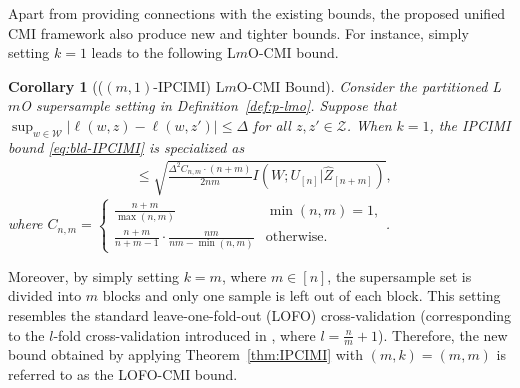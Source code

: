 \documentclass[onecolumn,romanappendices,10pt]{IEEEtran}
\newtheorem{corollary}{Corollary}
\newcommand{\Wcal}{{\mathcal W}}
\newcommand{\Zcal}{{\mathcal Z}}
\DeclareMathOperator{\gen}{\overline{gen}}
\begin{document}
	Apart from providing connections with the existing bounds, the proposed unified CMI framework also produce new and tighter bounds. For instance, simply setting $k=1$ leads to the following L$m$O-CMI bound.
	\begin{corollary}[($(m, 1)$-IPCIMI) L$m$O-CMI Bound] \label{cor:lmo-CMI}
		Consider the partitioned L$m$O supersample setting in Definition~\ref{def:p-lmo}. Suppose that $\sup_{w \in \Wcal} |\ell(w, z) - \ell(w, z')| \leq \Delta$ for all $z, z' \in \Zcal$. When $k=1$, the IPCIMI bound \eqref{eq:bld-IPCIMI} is specialized as
		\begin{align}
			\gen \leq \sqrt{\frac{\Delta^2 C_{n,m} \cdot (n+m)}{2nm} I\left( W; U_{[n]} | \hat{Z}_{[n+m]} \right)},
			\label{eq:lmo-CMI}
		\end{align}
		where $C_{n,m} = \begin{cases}
			\frac{n+m}{\max(n, m)} &  \min(n, m) = 1, \\
			\frac{n+m}{n+m-1} \cdot \frac{nm}{nm - \min(n, m)} & \text{otherwise.}
		\end{cases}$.
	\end{corollary}
	
	Moreover, by simply setting $k = m$, where $m \in [n]$, the supersample set is divided into $m$ blocks and only one sample is left out of each block. This setting resembles the standard leave-one-fold-out (LOFO) cross-validation (corresponding to the $l$-fold cross-validation introduced in \cite{mohri2018foundations}, where $l = \frac{n}{m} + 1$). Therefore, the new bound obtained by applying Theorem~\ref{thm:IPCIMI} with $(m, k) = (m, m)$ is referred to as the LOFO-CMI bound.
	
\end{document}
